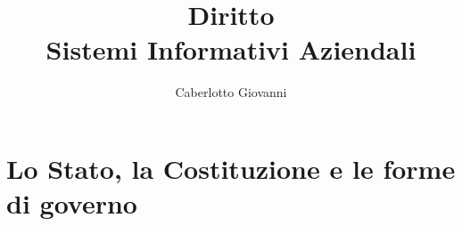 \documentclass{report}
\title{\Huge{Diritto}\\Sistemi Informativi Aziendali}
\author{\huge{Caberlotto Giovanni}}
\date{}
\begin{document}
\maketitle
\newpage%
\tableofcontents
\pagebreak

\chapter{Lo Stato, la Costituzione e le forme di governo}

\end{document}
